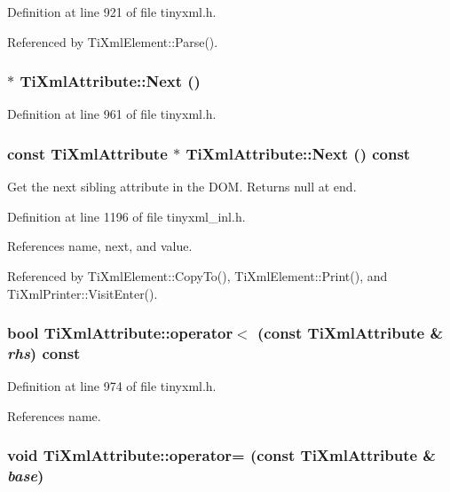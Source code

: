 Definition at line 921 of file tinyxml.h.

Referenced by TiXmlElement::Parse().\hypertarget{class_ti_xml_attribute_a138320aa7793b148ba7e5bd0a0ea4db6}{
\subsubsection[{Next}]{$\ast$ TiXmlAttribute::Next ()}}
\label{class_ti_xml_attribute_a138320aa7793b148ba7e5bd0a0ea4db6}


Definition at line 961 of file tinyxml.h.\hypertarget{class_ti_xml_attribute_a776478980776a024f7c2846eec640f65}{
\subsubsection[{Next}]{\setlength{\rightskip}{0pt plus 5cm}const {\bf TiXmlAttribute} $\ast$ TiXmlAttribute::Next () const}}
\label{class_ti_xml_attribute_a776478980776a024f7c2846eec640f65}


Get the next sibling attribute in the DOM. Returns null at end. 

Definition at line 1196 of file tinyxml\_\-inl.h.

References name, next, and value.

Referenced by TiXmlElement::CopyTo(), TiXmlElement::Print(), and TiXmlPrinter::VisitEnter().\hypertarget{class_ti_xml_attribute_adb8b6f2cad5948e73e383182e7ce10de}{
\subsubsection[{operator$<$}]{\setlength{\rightskip}{0pt plus 5cm}bool TiXmlAttribute::operator$<$ (const {\bf TiXmlAttribute} \& {\em rhs}) const}}
\label{class_ti_xml_attribute_adb8b6f2cad5948e73e383182e7ce10de}


Definition at line 974 of file tinyxml.h.

References name.\hypertarget{class_ti_xml_attribute_a83b9c2a47dbfadf5029f2c0f13c18466}{
\subsubsection[{operator=}]{\setlength{\rightskip}{0pt plus 5cm}void TiXmlAttribute::operator= (const {\bf TiXmlAttribute} \& {\em base})}}
\label{class_ti_xml_attribute_a83b9c2a47dbfadf5029f2c0f13c18466}


